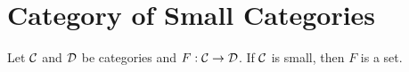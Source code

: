 \documentclass{book}
\begin{document}
%
%	






























































	\section{Category of Small Categories}

	
	
	\begin{ex} 
		Let $\mathcal{C}$ and $\mathcal{D}$ be categories and $F:\mathcal{C} \rightarrow \mathcal{D}$. If $\mathcal{C}$ is small, then $F$ is a set.
	\end{ex}
	
\end{document}
